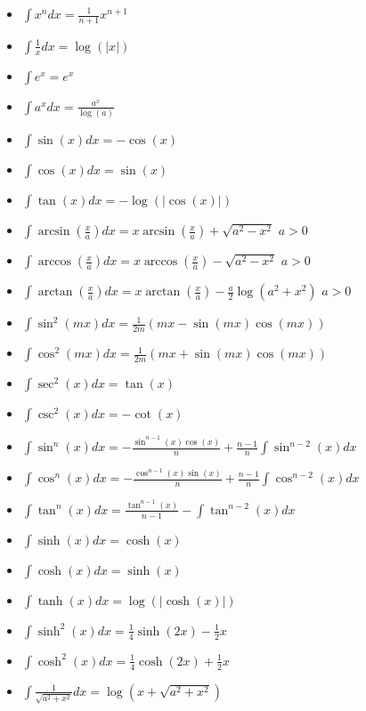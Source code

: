 \documentclass[12pt]{article}
\newcommand{\abs}[1]{\left\vert #1 \right\vert}
\begin{document}
\begin{multicols}{3}

\begin{itemize}
    \item $\int x^n dx = \frac{1}{n+1}x^{n+1}$
    \item $\int \frac{1}{x} dx = \log(\abs{x})$
    \item $\int e^x = e^x$
    \item $\int a^x dx = \frac{a^x}{\log(a)}$
    \item $\int \sin(x)dx = -\cos(x)$
    \item $\int \cos(x)dx = \sin(x)$
    \item $\int \tan(x)dx = -\log(\abs{\cos(x)})$
    \item $\int \arcsin\left( \frac{x}{a} \right)dx = x\arcsin\left(\frac{x}{a} \right)
        + \sqrt{a^2 - x^2}$ $a > 0$
    \item $\int \arccos\left( \frac{x}{a}\right)dx = x\arccos\left(\frac{x}{a} \right)
        - \sqrt{a^2 - x^2}$ $a > 0$
    \item $\int \arctan\left( \frac{x}{a}\right)dx = x\arctan\left(\frac{x}{a} \right)
        - \frac{a}{2} \log\left(a^2+ x^2\right)$ $a > 0$
    \item $\int \sin^2(mx)dx = \frac{1}{2m}(mx-\sin(mx)\cos(mx))$
    \item $\int \cos^2(mx)dx = \frac{1}{2m}(mx+ \sin(mx)\cos(mx))$
    \item $\int \sec^2(x)dx = \tan(x)$
    \item $\int \csc^2(x)dx = -\cot(x)$
    \item $\int \sin^n(x)dx = - \frac{\sin^{n-1}(x)\cos(x)}{n} +
        \frac{n-1}{n}\int \sin^{n-2}(x)dx$
    \item $\int \cos^n(x)dx = - \frac{\cos^{n-1}(x)\sin(x)}{n} +
        \frac{n-1}{n}\int \cos^{n-2}(x)dx$
    \item $\int \tan^n(x)dx = \frac{\tan^{n-1}(x)}{n-1} - \int \tan^{n-2}(x)dx$
    \item $\int \sinh(x)dx = \cosh(x)$
    \item $\int \cosh(x)dx = \sinh(x)$
    \item $\int \tanh(x)dx = \log(\abs{\cosh(x)})$
    \item $\int \sinh^2(x)dx = \frac{1}{4}\sinh(2x) - \frac{1}{2}x$
    \item $\int \cosh^2(x)dx = \frac{1}{4}\cosh(2x) + \frac{1}{2}x$
    \item $\int \frac{1}{\sqrt{a^2 + x^2}}dx = \log \left( x + \sqrt{a^2 + x^2} \right)$

\end{itemize}
\end{multicols}
\end{document}
